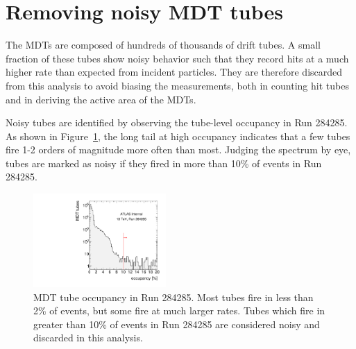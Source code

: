 \section{Removing noisy MDT tubes}
\label{sec:noisytubes}

The MDTs are composed of hundreds of thousands of drift tubes. A small fraction of these tubes show noisy behavior such that they record hits at a much higher rate than expected from incident particles. They are therefore discarded from this analysis to avoid biasing the measurements, both in counting hit tubes and in deriving the active area of the MDTs.

Noisy tubes are identified by observing the tube-level occupancy in Run 284285. As shown in Figure~\ref{fig:noisytubes}, the long tail at high occupancy indicates that a few tubes fire 1-2 orders of magnitude more often than most. Judging the spectrum by eye, tubes are marked as noisy if they fired in more than 10\% of events in Run 284285.

\begin{figure}
  \begin{center}
    \includegraphics[width=0.45\textwidth]{./figures/occupancy_00284285.pdf}
    \caption{MDT tube occupancy in Run 284285. Most tubes fire in less than 2\% of events, but some fire at much larger rates. Tubes which fire in greater than 10\% of events in Run 284285 are considered noisy and discarded in this analysis.}
    \label{fig:noisytubes}
  \end{center}
\end{figure}


